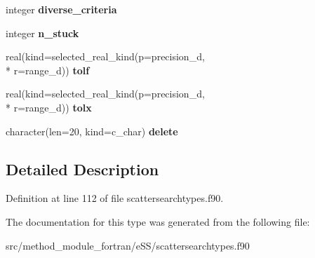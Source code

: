 \begin{DoxyCompactItemize}
\item 
\hypertarget{structscattersearchtypes_1_1goptions_a4905626a8491234c09d2c6976a19a071}{integer {\bfseries diverse\-\_\-criteria}}\label{structscattersearchtypes_1_1goptions_a4905626a8491234c09d2c6976a19a071}

\item 
\hypertarget{structscattersearchtypes_1_1goptions_a60596f71c0ea968641ba3b1c64e0348f}{integer {\bfseries n\-\_\-stuck}}\label{structscattersearchtypes_1_1goptions_a60596f71c0ea968641ba3b1c64e0348f}

\item 
\hypertarget{structscattersearchtypes_1_1goptions_a044944f7a94c0a9dbd066389c11fa52e}{real(kind=selected\-\_\-real\-\_\-kind(p=precision\-\_\-d, \\*
r=range\-\_\-d)) {\bfseries tolf}}\label{structscattersearchtypes_1_1goptions_a044944f7a94c0a9dbd066389c11fa52e}

\item 
\hypertarget{structscattersearchtypes_1_1goptions_ad75ea7050859564a8773fd2dd0590eff}{real(kind=selected\-\_\-real\-\_\-kind(p=precision\-\_\-d, \\*
r=range\-\_\-d)) {\bfseries tolx}}\label{structscattersearchtypes_1_1goptions_ad75ea7050859564a8773fd2dd0590eff}

\item 
\hypertarget{structscattersearchtypes_1_1goptions_acf32af9bdacc2f8359c11d905947325b}{character(len=20, kind=c\-\_\-char) {\bfseries delete}}\label{structscattersearchtypes_1_1goptions_acf32af9bdacc2f8359c11d905947325b}

\end{DoxyCompactItemize}


\subsection{Detailed Description}


Definition at line 112 of file scattersearchtypes.\-f90.



The documentation for this type was generated from the following file\-:\begin{DoxyCompactItemize}
\item 
src/method\-\_\-module\-\_\-fortran/e\-S\-S/scattersearchtypes.\-f90\end{DoxyCompactItemize}
